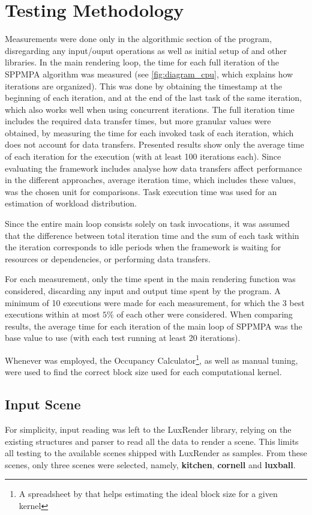 \documentclass[main.tex]{subfiles}
\begin{document}
\section{Testing Methodology} \label{sec:results:method}

Measurements were done only in the algorithmic section of the program, disregarding any input/ouput operations as well as initial setup of \starpu and other libraries. In the main rendering loop, the time for each full iteration of the SPPMPA algorithm was measured (see \cref{fig:diagram_cpu}, which explains how iterations are organized). This was done by obtaining the timestamp at the beginning of each iteration, and at the end of the last task of the same iteration, which also works well when using concurrent iterations. The full iteration time includes the required data transfer times, but more granular values were obtained, by measuring the time for each invoked task of each iteration, which does not account for data transfers. Presented results show only the average time of each iteration for the execution (with at least 100 iterations each).
Since evaluating the framework includes analyse how data transfers affect performance in the different approaches, average iteration time, which includes these values, was the chosen unit for comparisons. Task execution time was used for an estimation of workload distribution.

Since the entire main loop consists solely on task invocations, it was assumed that the difference between total iteration time and the sum of each task within the iteration corresponds to idle periods when the framework is waiting for resources or dependencies, or performing data transfers.

For each measurement, only the time spent in the main rendering function was considered, discarding any input and output time spent by the program. A minimum of 10 executions were made for each measurement, for which the 3 best executions within at most $5\%$ of each other were considered. When comparing results, the average time for each iteration of the main loop of SPPMPA was the base value to use (with each test running at least 20 iterations).

Whenever \cuda was employed, the \cuda Occupancy Calculator\footnote{A spreadsheet by \nvidia that helps estimating the ideal block size for a given kernel}, as well as manual tuning, were used to find the correct block size used for each computational kernel.

\subsection{Input Scene}

For simplicity, input reading was left to the LuxRender library, relying on the existing structures and parser to read all the data to render a scene. This limits all testing to the available scenes shipped with LuxRender as samples. From these scenes, only three scenes were selected, namely, \textbf{kitchen}, \textbf{cornell} and \textbf{luxball}.
\end{document}

